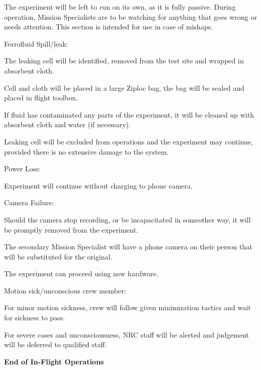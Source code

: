 \begin{checklist}

	\item The experiment will be left to run on its own, as it is fully passive. During operation, Mission Specialists are to be watching for anything that goes wrong or needs attention. This section is intended for use in case of mishaps. 
	\item Ferrofluid Spill/leak:
    \begin{checklist}
		\item The leaking cell will be identified, removed from the test site and wrapped in absorbent cloth.
		\item Cell and cloth will be placed in a large Ziploc bag, the bag will be sealed and placed in flight toolbox. 
		\item If fluid has contaminated any parts of the experiment, it will be cleaned up with absorbent cloth and water (if necessary).
		\item Leaking cell will be excluded from operations and the experiment may continue, provided there is no extensive damage to the system. 
    \end{checklist}
	\item Power Loss:
    \begin{checklist}
        \item Experiment will continue without charging to phone camera.
    \end{checklist}
	\item Camera Failure:
    \begin{checklist}
		\item Should the camera stop recording, or be incapacitated in someother way, it will be promptly removed from the experiment.
		\item The secondary Mission Specialist will have a phone camera on their person that will be substituted for the original.
		\item The experiment can proceed using new hardware. 
    \end{checklist}
	\item Motion sick/unconscious crew member:
    \begin{checklist}
		\item For minor motion sickness, crew will follow given minimization tactics and wait for sickness to pass.
		\item For severe cases and unconsciousness, NRC staff will be alerted and judgement will be deferred to qualified staff.
    \end{checklist}
\end{checklist}
\textbf{End of In-Flight Operations}




